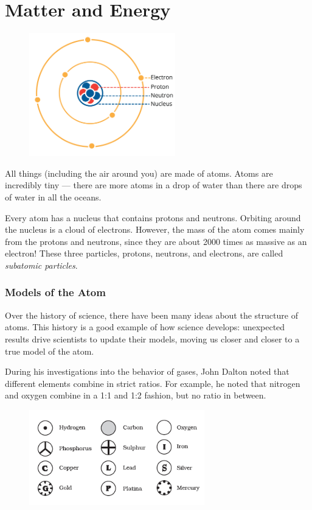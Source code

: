 \chapter{Matter and Energy}

\begin{figure}
\noindent\includegraphics[trim={0 5cm 0 0}, width=2.5in]{atom1.png}
\end{figure}

All things (including the air around you) are made of atoms. Atoms are
incredibly tiny --- there are more atoms in a drop of water than there are
drops of water in all the oceans.

Every atom has a nucleus that contains protons and neutrons. Orbiting around the
nucleus is a cloud of electrons. However, the mass of the atom
comes mainly from the protons and neutrons, since they are about 2000 times as
massive as an electron! These three particles, protons, neutrons, and 
electrons, are called \textit{subatomic particles}. 
 

\subsection{Models of the Atom}
Over the history of science, there have been many ideas about the structure of
atoms. This history is a good example of how science develops: unexpected
results drive scientists to update their models, moving us closer and closer to
a true model of the atom.

During his investigations into the behavior of gases,
John Dalton noted that different elements combine in strict
ratios. For example, he noted that nitrogen and oxygen combine in a 1:1 and 1:2
fashion, but no ratio in between.

\begin{figure}
\noindent\includegraphics[width=3in]{daltons_model.png}
\end{figure}

